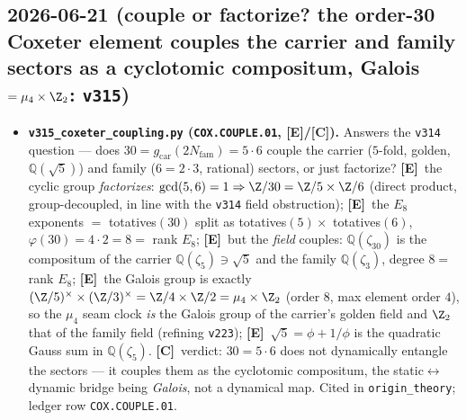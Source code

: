 \documentclass[11pt]{article}
\providecommand{\mE}{\textbf{[E]}}\providecommand{\mC}{\textbf{[C]}}
\providecommand{\gcar}{g_{\mathrm{car}}}\providecommand{\Nfam}{N_{\mathrm{fam}}}
\begin{document}
\subsection*{2026-06-21 (couple or factorize? the order-30 Coxeter element couples the carrier and family sectors as a cyclotomic compositum, Galois $=\mu_4\times\Z_2$: \texttt{v315})}
\begin{itemize}
\item \textbf{\texttt{v315\_coxeter\_coupling.py} (\texttt{COX.COUPLE.01}, \mE/\mC).} Answers the \texttt{v314}
  question --- does $30=\gcar(2\Nfam)=5\cdot6$ couple the carrier ($5$-fold, golden, $\mathbb Q(\sqrt5)$) and family
  ($6=2\cdot3$, rational) sectors, or just factorize? \mE\ the cyclic group \emph{factorizes}: $\gcd(5,6)=1\Rightarrow
  \Z/30=\Z/5\times\Z/6$ (direct product, group-decoupled, in line with the \texttt{v314} field obstruction); \mE\ the
  $E_8$ exponents $=$ totatives$(30)$ split as totatives$(5)\times$ totatives$(6)$, $\varphi(30)=4\cdot2=8=$ rank
  $E_8$; \mE\ but the \emph{field} couples: $\mathbb Q(\zeta_{30})$ is the compositum of the carrier
  $\mathbb Q(\zeta_5)\ni\sqrt5$ and the family $\mathbb Q(\zeta_3)$, degree $8=$ rank $E_8$; \mE\ the Galois group is
  exactly $(\Z/5)^\times\times(\Z/3)^\times=\Z/4\times\Z/2=\mu_4\times\Z_2$ (order $8$, max element order $4$), so the
  $\mu_4$ seam clock \emph{is} the Galois group of the carrier's golden field and $\Z_2$ that of the family field
  (refining \texttt{v223}); \mE\ $\sqrt5=\phi+1/\phi$ is the quadratic Gauss sum in $\mathbb Q(\zeta_5)$. \mC\ verdict:
  $30=5\cdot6$ does not dynamically entangle the sectors --- it couples them as the cyclotomic compositum, the
  static$\leftrightarrow$dynamic bridge being \emph{Galois}, not a dynamical map. Cited in \texttt{origin\_theory};
  ledger row \texttt{COX.COUPLE.01}.
\end{itemize}
\end{document}
